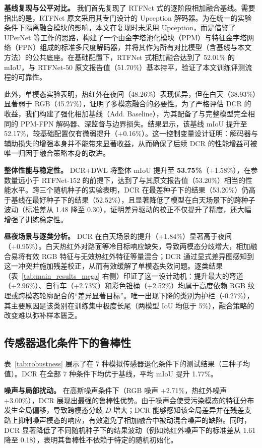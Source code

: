 \documentclass[10pt,conference]{IEEEtran}
\begin{document}
\textbf{基线复现与公平对比。} 我们首先复现了 RTFNet 式的逐阶段相加融合基线。需要指出的是，RTFNet 原文采用其专门设计的 Upception 解码器。为在统一的实验条件下隔离融合模块的影响，本文在复现时未采用 Upception，而是借鉴了 UPerNet \cite{b14}等工作的思路，构建了一个由金字塔池化模块（PPM）与特征金字塔网络（FPN）组成的标准多尺度解码器，并将其作为所有对比模型（含基线与本文方法）的公共底座。在基础配置下，RTFNet 式相加融合达到了 52.01\% 的 mIoU，与 RTFNet-50 原文报告值（51.70\%）基本持平，验证了本文训练评测流程的可靠性。

此外，单模态实验表明，热红外在夜间（48.26\%）表现优异，但在白天（38.93\%）显著弱于 RGB（45.27\%），证明了多模态融合的必要性。为了严格评估 DCR 的收益，我们构建了强化相加基线（Add. Baseline），为其配备了与完整模型完全相同的 PPM-FPN 解码器、深监督与边界损失。结果显示，该基线 mIoU 提升至 52.17\%，较基础配置仅有微弱提升（+0.16\%）。这一控制变量设计证明：解码器与辅助损失的增强本身并不能带来显著收益，从而确保了后续 DCR 的性能增益可被唯一归因于融合策略本身的改进。

\textbf{整体性能与稳定性。} DCR+DWL 将整体 mIoU 提升至 \textbf{53.75\%}（+1.58\%），在参数量远小于 RTFNet-152 的前提下，达到了与其原文报告值（53.20\%）相当的性能水平。跨三个随机种子的实验表明，DCR 在最差种子下的结果（53.20\%）仍高于基线在最好种子下的结果（52.52\%），且显著降低了模型在白天场景下的跨种子波动（标准差从 1.48 降至 0.30），证明差异驱动的校正不仅提升了精度，还大幅增强了训练稳定性。

\textbf{昼夜场景与逐类分析。} DCR 在白天场景的提升（+1.84\%）显著高于夜间（+0.95\%）。白天热红外对路面等冷目标响应缺失，导致两模态分歧增大，相加融合易将有效 RGB 特征与无效热红外特征等量混合；DCR 通过显式差异图感知到这一冲突并施加残差校正，从而有效缓解了单模态失效问题。逐类结果（表~\ref{tab:main_results_mega} 右侧）印证了这一设计动机：提升最大的弯道（+2.96\%）、自行车（+2.73\%）和彩色锥桶（+2.52\%）均属于高度依赖 RGB 纹理或跨模态轮廓配合的“差异显著目标”。唯一出现下降的类别为护栏（-0.27\%），其主要原因是该类别在训练集中极度长尾（两模型 IoU 均低于 5\%），融合策略的改变难以弥补样本匮乏。



\subsection{传感器退化条件下的鲁棒性}

表~\ref{tab:robustness} 展示了在 7 种模拟传感器退化条件下的测试结果（三种子均值）。DCR 在全部 7 种条件下均优于基线，平均 mIoU 提升 1.77\%。

\textbf{噪声与局部扰动。} 在高斯噪声条件下（RGB 噪声 +2.71\%，热红外噪声 +3.00\%），DCR 展现出最强的鲁棒性优势。由于噪声会使受污染模态的特征分布发生全局偏移，导致跨模态分歧 \(D\) 增大；DCR 能够感知该全局差异并在残差支路上抑制噪声模态的响应，有效避免了相加融合中被动混合噪声的缺陷。同时，DCR 显著降低了不同随机种子下的结果波动（例如热红外噪声下的标准差从 1.61 降至 0.18），表明其鲁棒性不依赖于特定的随机初始化。
\end{document}
